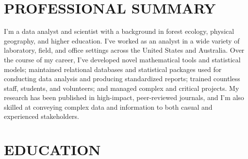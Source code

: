 \documentclass[11pt,a4paper,]{awesome-cv}
\begin{document}
\makecvheader






\hypertarget{professional-summary}{%
\section{PROFESSIONAL SUMMARY}\label{professional-summary}}

I'm a data analyst and scientist with a background in forest ecology,
physical geography, and higher education. I've worked as an analyst in a
wide variety of laboratory, field, and office settings across the United
States and Australia. Over the course of my career, I've developed novel
mathematical tools and statistical models; maintained relational
databases and statistical packages used for conducting data analysis and
producing standardized reports; trained countless staff, students, and
volunteers; and managed complex and critical projects. My research has
been published in high-impact, peer-reviewed journals, and I'm also
skilled at conveying complex data and information to both casual and
experienced stakeholders.

\hypertarget{education}{%
\section{EDUCATION}\label{education}}
\end{document}
